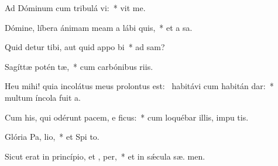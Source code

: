 \item Ad Dóminum cum tribulá vi:~*  vit me.
\item Dómine, líbera ánimam meam a lábi quis,~* et a  sa.
\item Quid detur tibi, aut quid appo bi~* ad  sam?
\item Sagíttæ potén tæ,~* cum carbónibus riis.
\item Heu mihi! quia incolátus meus prolontus est:~\pscross{} habitávi cum habitán dar:~* multum íncola fuit  a.
\item Cum his, qui odérunt pacem, e ficus:~* cum loquébar illis, impu  tis.
\item Glória Pa,  lio,~* et Spi to.
\item Sicut erat in princípio, et ,  per,~* et in sǽcula sæ. men.
